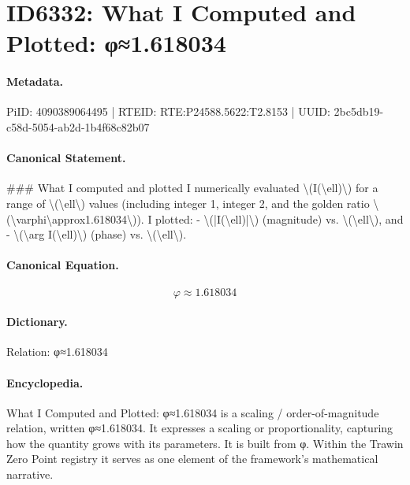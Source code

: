 \section*{ID6332: What I Computed and Plotted: φ≈1.618034}
\paragraph{Metadata.}
PiID: 4090389064495 | RTEID: RTE:P24588.5622:T2.8153 | UUID: 2bc5db19-c58d-5054-ab2d-1b4f68c82b07

\paragraph{Canonical Statement.}
\#\#\# What I computed and plotted I numerically evaluated \textbackslash{}(I(\textbackslash{}ell)\textbackslash{}) for a range of \textbackslash{}(\textbackslash{}ell\textbackslash{}) values (including integer 1, integer 2, and the golden ratio \textbackslash{}(\textbackslash{}varphi\textbackslash{}approx1.618034\textbackslash{})). I plotted: - \textbackslash{}(|I(\textbackslash{}ell)|\textbackslash{}) (magnitude) vs. \textbackslash{}(\textbackslash{}ell\textbackslash{}), and - \textbackslash{}(\textbackslash{}arg I(\textbackslash{}ell)\textbackslash{}) (phase) vs. \textbackslash{}(\textbackslash{}ell\textbackslash{}).

\paragraph{Canonical Equation.}
\[
\varphi\approx1.618034
\]

\paragraph{Dictionary.}
Relation: φ≈1.618034

\paragraph{Encyclopedia.}
What I Computed and Plotted: φ≈1.618034 is a scaling / order-of-magnitude relation, written φ≈1.618034. It expresses a scaling or proportionality, capturing how the quantity grows with its parameters. It is built from φ. Within the Trawin Zero Point registry it serves as one element of the framework's mathematical narrative.
